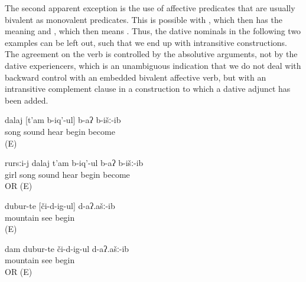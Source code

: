 The second apparent exception is the use of affective predicates that are usually bivalent as monovalent predicates. This is possible with , which then has the meaning  and , which then means . Thus, the dative nominals in the following two examples can be left out, such that we end up with intransitive constructions. The agreement on the verb  is controlled by the absolutive arguments, not by the dative experiencers, which is an unambiguous indication that we do not deal with backward control with an embedded bivalent affective verb, but with an intransitive complement clause in a construction to which a dative adjunct has been added.
%
\begin{exe}
	\ex	\label{ex:‎The song began to be audible}
	\gll	dalaj	[t'am	b-iq'-ul]	b-aʔ	b-išː-ib\\
		song	sound	hear	\tsc{n-}begin	become\\
	\glt	{} (E)

	\ex	\label{ex:‎The girl began to hear the song}
	\gll	rursːi-j	dalaj	t'am	b-iq'-ul	b-aʔ	b-išː-ib\\
		girl	song	sound	hear	\tsc{n-}begin	become\\
	\glt	{} OR  (E)

	\ex	\label{ex:‎The mountains started to be visible}
	\gll	dubur-te	[či-d-ig-ul]	d-aʔ.ašː-ib\\
		mountain	see	begin\\
	\glt	{} (E)

	\ex	\label{ex:‎I began to see the mountains}
	\gll	dam	dubur-te	či-d-ig-ul	d-aʔ.ašː-ib\\
			mountain	see	begin\\
	\glt	{} OR  (E)
\end{exe}

